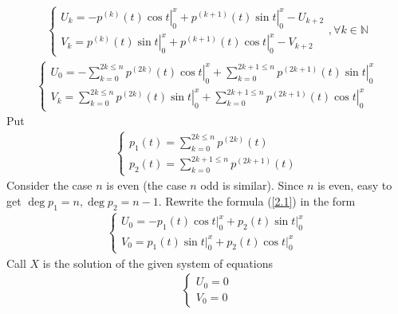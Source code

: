 \documentclass{article}
\numberwithin{equation}{section}
\begin{document}
\begin{align}
\left\{ \begin{array}{l}
{U_k} = \left. { - {p^{\left( k \right)}}\left( t \right)\cos t} \right|_0^x + \left. {{p^{\left( {k + 1} \right)}}\left( t \right)\sin t} \right|_0^x - {U_{k + 2}}\\
{V_k} = \left. {{p^{\left( k \right)}}\left( t \right)\sin t} \right|_0^x + \left. {{p^{\left( {k + 1} \right)}}\left( t \right)\cos t} \right|_0^x - {V_{k + 2}}
\end{array} \right.,\forall k \in \mathbb{N}
\end{align}
\begin{align}
\left\{ \begin{array}{l}
{U_0} =  - \sum\limits_{k = 0}^{2k \le n} {\left. {{p^{\left( {2k} \right)}}\left( t \right)\cos t} \right|_0^x}  + \sum\limits_{k = 0}^{2k + 1 \le n} {\left. {{p^{\left( {2k + 1} \right)}}\left( t \right)\sin t} \right|_0^x} \\
{V_k} = \sum\limits_{k = 0}^{2k \le n} {\left. {{p^{\left( {2k} \right)}}\left( t \right)\sin t} \right|_0^x}  + \sum\limits_{k = 0}^{2k + 1 \le n} {\left. {{p^{\left( {2k + 1} \right)}}\left( t \right)\cos t} \right|_0^x} 
\end{array} \right.
\end{align}
Put 
\begin{align}
\left\{ \begin{array}{l}
{p_1}\left( t \right) = \sum\limits_{k = 0}^{2k \le n} {{p^{\left( {2k} \right)}}\left( t \right)} \\
{p_2}\left( t \right) = \sum\limits_{k = 0}^{2k + 1 \le n} {{p^{\left( {2k + 1} \right)}}\left( t \right)} 
\end{array} \right.
\end{align}
Consider the case $n$ is even (the case $n$ odd is similar). Since $n$ is even, easy to get $\deg {p_1} = n,\deg {p_2} = n - 1$. Rewrite the formula (\ref{2.1}) in the form
\begin{align}
\left\{ {\begin{array}{*{20}{c}}
{{U_0} =  - {p_1}\left( t \right)\left. {\cos t} \right|_0^x + {p_2}\left( t \right)\left. {\sin t} \right|_0^x}\\
{{V_0} = {p_1}\left( t \right)\left. {\sin t} \right|_0^x + {p_2}\left( t \right)\left. {\cos t} \right|_0^x}
\end{array}} \right.
\end{align}
Call $X$ is the solution of the given system of equations 
\begin{align}
\left\{ {\begin{array}{*{20}{c}}
{{U_0} = 0}\\
{{V_0} = 0}
\end{array}} \right.
\end{align}
\end{document}
